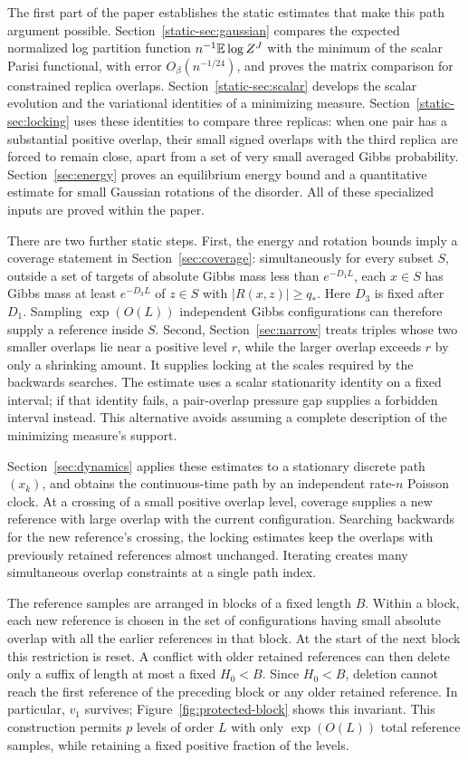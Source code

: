 The first part of the paper establishes the static estimates that
make this path argument possible. Section~\ref{static-sec:gaussian}
compares the expected normalized log partition function
$n^{-1}\mathbb E\log Z^J$ with the minimum of the scalar Parisi functional,
with error $O_\beta(n^{-1/24})$, and proves the matrix comparison
for constrained replica overlaps.
Section~\ref{static-sec:scalar} develops the scalar evolution and
the variational identities of a minimizing measure.
Section~\ref{static-sec:locking} uses these identities to compare
three replicas: when one pair has a substantial positive overlap, their
small signed overlaps with the third replica are forced to remain close,
apart from a set of very small averaged Gibbs probability.
Section~\ref{sec:energy} proves an equilibrium energy bound and a
quantitative estimate for small Gaussian rotations of the disorder.
All of these specialized inputs are proved within the paper.

There are two further static steps. First, the energy and rotation
bounds imply a coverage statement in Section~\ref{sec:coverage}:
simultaneously for every subset $S$, outside a set of targets of
absolute Gibbs mass less than $e^{-D_1L}$, each $x\in S$ has
Gibbs mass at least $e^{-D_3L}$ of $z\in S$ with $|R(x,z)|\ge q_*$.
Here $D_3$ is fixed after $D_1$. Sampling $\exp(O(L))$ independent
Gibbs configurations can therefore supply a reference inside $S$.
Second, Section~\ref{sec:narrow} treats triples whose two smaller
overlaps lie near a positive level $r$, while the larger overlap exceeds
$r$ by only a shrinking amount. It supplies locking at the scales
required by the backwards searches. The estimate uses a scalar
stationarity identity on a fixed interval; if that identity fails, a
pair-overlap pressure gap supplies a forbidden interval instead. This
alternative avoids assuming a complete description of the minimizing
measure's support.

Section~\ref{sec:dynamics} applies these estimates to a stationary
discrete path $(x_k)$, and obtains the continuous-time path by an
independent rate-$n$ Poisson clock. At a crossing of a small positive
overlap level, coverage supplies a new reference with large overlap
with the current configuration. Searching backwards for the new
reference's crossing, the locking estimates keep the overlaps with
previously retained references almost unchanged. Iterating creates
many simultaneous overlap constraints at a single path index.

The reference samples are arranged in blocks of a fixed length $B$.
Within a block, each new reference is chosen in the set of
configurations having small absolute overlap with all the earlier
references in that block. At the start of the next block this
restriction is reset. A conflict with older retained references can
then delete only a suffix of length at most a fixed $H_0<B$.
Since $H_0<B$, deletion cannot reach the first reference of the
preceding block or any older retained reference. In particular,
$v_1$ survives; Figure~\ref{fig:protected-block} shows this invariant.
This construction permits $p$ levels of order $L$
with only $\exp(O(L))$ total reference samples, while retaining a
fixed positive fraction of the levels.

